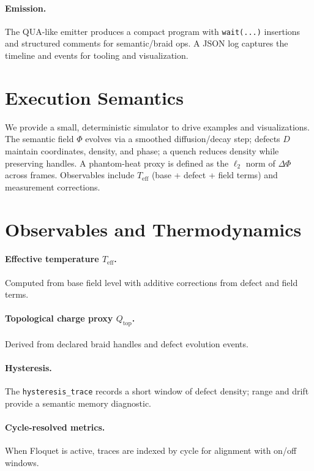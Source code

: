 \documentclass[11pt]{article}
\newcommand{\Teff}{T_{\mathrm{eff}}}
\newcommand{\Qtop}{Q_{\mathrm{top}}}
\newcommand{\Phif}{\Phi}
\begin{document}
\paragraph{Emission.} The QUA-like emitter produces a compact program with \verb|wait(...)| insertions and structured comments for semantic/braid ops. A JSON log captures the timeline and events for tooling and visualization.

\section{Execution Semantics}
\label{sec:exec}
We provide a small, deterministic simulator to drive examples and visualizations. The semantic field $\Phif$ evolves via a smoothed diffusion/decay step; defects $D$ maintain coordinates, density, and phase; a quench reduces density while preserving handles. A phantom-heat proxy is defined as the $\ell_2$ norm of $\Delta \Phif$ across frames. Observables include $\Teff$ (base + defect + field terms) and measurement corrections.

\section{Observables and Thermodynamics}
\label{sec:observables}
\paragraph{Effective temperature $\Teff$.} Computed from base field level with additive corrections from defect and field terms.
\paragraph{Topological charge proxy $\Qtop$.} Derived from declared braid handles and defect evolution events.
\paragraph{Hysteresis.} The \texttt{hysteresis\_trace} records a short window of defect density; range and drift provide a semantic memory diagnostic.
\paragraph{Cycle-resolved metrics.} When Floquet is active, traces are indexed by cycle for alignment with on/off windows.
\end{document}
